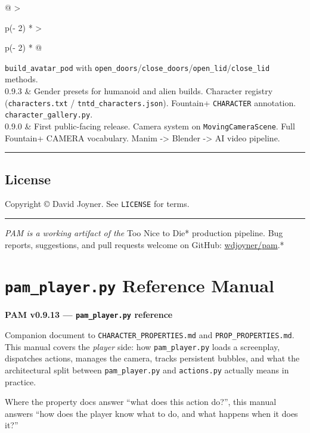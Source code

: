 \documentclass[
  11pt,
]{book}
\begin{document}
\begin{longtable}[]{@{}
  >{\raggedright\arraybackslash}p{(\columnwidth - 2\tabcolsep) * }
  >{\raggedright\arraybackslash}p{(\columnwidth - 2\tabcolsep) * }@{}}
\texttt{build\_avatar\_pod} with
\texttt{open\_doors}/\texttt{close\_doors}/\texttt{open\_lid}/\texttt{close\_lid}
methods. \\
0.9.3 & Gender presets for humanoid and alien builds. Character registry
(\texttt{characters.txt} / \texttt{tntd\_characters.json}). Fountain+
\texttt{CHARACTER} annotation. \texttt{character\_gallery.py}. \\
0.9.0 & First public-facing release. Camera system on
\texttt{MovingCameraScene}. Full Fountain+ CAMERA vocabulary. Manim
-\textgreater{} Blender -\textgreater{} AI video pipeline. \\
\end{longtable}

\begin{center}\rule{0.5\linewidth}{0.5pt}\end{center}

\section{License}\label{license}

Copyright © David Joyner. See \texttt{LICENSE} for terms.

\begin{center}\rule{0.5\linewidth}{0.5pt}\end{center}

\emph{PAM is a working artifact of the }Too Nice to Die* production
pipeline. Bug reports, suggestions, and pull requests welcome on GitHub:
\href{https://github.com/wdjoyner/pam}{wdjoyner/pam}.*

\chapter{\texorpdfstring{\texttt{pam\_player.py} Reference
Manual}{pam\_player.py Reference Manual}}\label{pam_player.py-reference-manual}

\textbf{PAM v0.9.13 --- \texttt{pam\_player.py} reference}

Companion document to \texttt{CHARACTER\_PROPERTIES.md} and
\texttt{PROP\_PROPERTIES.md}. This manual covers the \emph{player} side:
how \texttt{pam\_player.py} loads a screenplay, dispatches actions,
manages the camera, tracks persistent bubbles, and what the
architectural split between \texttt{pam\_player.py} and
\texttt{actions.py} actually means in practice.

Where the property docs answer ``what does this action do?'', this
manual answers ``how does the player know what to do, and what happens
when it does it?''
\end{document}
